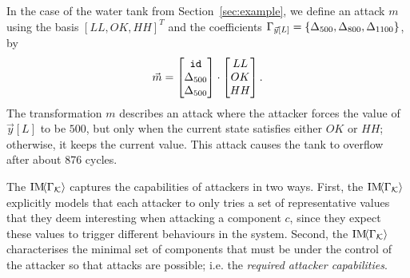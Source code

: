{\begin{example}
  \label{ex:attack}
  In the case of the water tank from Section~\ref{sec:example}, we define an attack $m$ using the basis $[LL, OK, HH]^T$ and the coefficients $\Gamma_{\vec{y}[L]}=\left\{{\Delta}_{500}, {\Delta}_{800},  {\Delta}_{1100}\right\}$, by
\begin{align}
  \vec{m}=
  \begin{bmatrix}
    {\texttt{id}} \\
    {\Delta}_{500} \\
    {\Delta}_{500}
  \end{bmatrix}
  \cdot
  \begin{bmatrix}
    LL \\
    OK\\
    HH
  \end{bmatrix}.
\end{align}
The transformation $m$ describes an attack where the attacker forces the value of $\vec{y}[L]$ to be $500$, but only when the current state satisfies either $OK$ or $HH$; otherwise, it keeps the current value. This attack causes the tank to overflow after about 876 cycles.
\end{example}
The $\text{IM}\!{{\left<\Gamma_{\mathcal{K}}\right>}}$ captures the capabilities of attackers in two ways. First, the $\text{IM}\!{{\left<\Gamma_{\mathcal{K}}\right>}}$ explicitly models that each attacker to only tries a set of representative values that they deem interesting when attacking a component $c$, since they expect these values to trigger different behaviours in the system. Second, the $\text{IM}\!{{\left<\Gamma_{\mathcal{K}}\right>}}$ characterises the minimal set of components that must be under the control of the attacker so that attacks are possible; i.e. the \emph{required attacker capabilities}.

}
